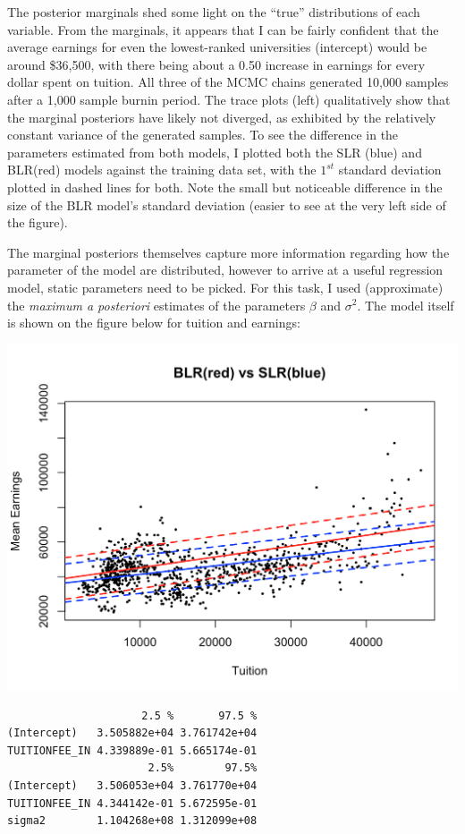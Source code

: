 \documentclass[10pt]{article}
\begin{document}
The posterior marginals shed some light on the ``true'' distributions of each variable. From the marginals, it appears that I can be fairly confident that the average earnings for even the lowest-ranked universities (intercept) would be around \$36,500, with there being about a 0.50 increase in earnings for every dollar spent on tuition. All three of the MCMC chains generated 10,000 samples after a 1,000 sample burnin period. The trace plots (left) qualitatively show that the marginal posteriors have likely not diverged, as exhibited by the relatively constant variance of the generated samples. To see the difference in the parameters estimated from both models, I plotted both the SLR (blue) and BLR(red) models against the training data set, with the $1^{st}$ standard deviation plotted in dashed lines for both. Note the small but noticeable difference in the size of the BLR model's standard deviation (easier to see at the very left side of the figure).  

The marginal posteriors themselves capture more information regarding how the parameter of the model are distributed, however to arrive at a useful regression model, static parameters need to be picked. For this task, I used (approximate) the {\it maximum a posteriori} estimates of the parameters $\beta$ and $\sigma^2$. The model itself is shown on the figure below for tuition and earnings: 

\includegraphics[width=\textwidth]{figures/blr_slr}

\begin{lstlisting}
                     2.5 %       97.5 %
(Intercept)   3.505882e+04 3.761742e+04
TUITIONFEE_IN 4.339889e-01 5.665174e-01
                      2.5%        97.5%
(Intercept)   3.506053e+04 3.761770e+04
TUITIONFEE_IN 4.344142e-01 5.672595e-01
sigma2        1.104268e+08 1.312099e+08
\end{lstlisting}
\end{document}
